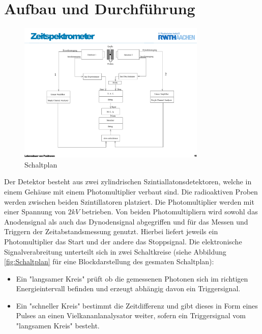 \documentclass[a4paper,12pt]{article}
\begin{document}
\section{Aufbau und Durchführung}
\begin{figure}[htb]
		\centering
		\includegraphics[width=0.8\textwidth]{schaltplan.pdf}
		\caption{Schaltplan}
		\label{fig:schaltplan}
\end{figure}
Der Detektor besteht aus zwei zylindrischen Szintiallatonsdetektoren,
 welche in einem Gehäuse mit einem Photomultiplier verbaut sind. Die radioaktiven Proben werden zwischen beiden Szintillatoren
platziert. Die Photomultiplier werden mit einer Spannung von $2\si{kV}$ betrieben. Von beiden Photomultipliern
wird sowohl das Anodensignal als auch das Dynodensignal abgegriffen und für das Messen und Triggern der 
Zeitabstandsmessung genutzt. Hierbei liefert jeweils ein Photomultiplier das Start und der andere 
das Stoppsignal.
Die elektronische Signalverabreitung unterteilt sich in zwei Schaltkreise
 (siehe Abbildung \ref{fig:Schaltplan} für eine Blockdarstellung des gesmaten Schaltplan): \\
\begin{itemize}
	\item
	Ein "langsamer Kreis" prüft ob die gemessenen Photonen sich im richtigen Energieintervall 
	befinden und erzeugt abhängig davon ein Triggersignal.
	\item Ein "schneller Kreis" bestimmt die Zeitdifferenz und gibt dieses in Form eines Pulses an einen
	Vielkananlanalysator weiter, sofern ein Triggersignal vom "langsamen Kreis" besteht.	
\end{itemize}
\end{document}
